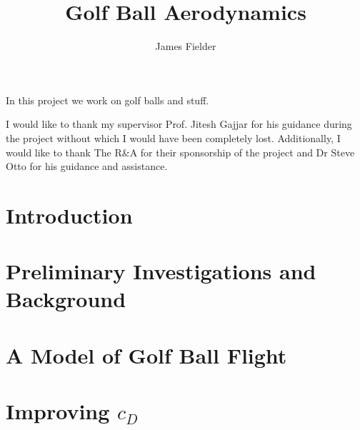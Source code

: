 \documentclass[12pt,MSc,twoside]{muthesis}
\numberwithin{equation}{section}
\begin{document}
\title{Golf Ball Aerodynamics}
\author{James Fielder}
\def\wordcount{xxxxx}




\beforeabstract

In this project we work on golf balls and stuff.

\afterabstract

I would like to thank my supervisor Prof. Jitesh Gajjar for his guidance during the project without 
which I would have been completely lost. Additionally, I would like to thank The R\&A for their sponsorship of the project and Dr Steve Otto for his guidance and assistance.

\afterpreface


\pagestyle{normal}
\chapter{Introduction}


\chapter{Preliminary Investigations and Background}


\chapter{A Model of Golf Ball Flight}


\chapter{Improving $c_{D}$}

\end{document}
